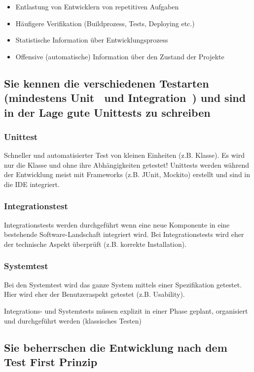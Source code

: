 \begin{itemize}
	\item Entlastung von Entwicklern von repetitiven Aufgaben
	\item Häufigere Verifikation (Buildprozess, Tests, Deploying etc.)
	\item Statistische Information über Entwicklungsprozess
	\item Offensive (automatische) Information über den Zustand der Projekte
\end{itemize}

\subsection{Sie kennen die verschiedenen Testarten (mindestens Unit~ und Integration~) und sind in der Lage gute Unittests zu schreiben}

\subsubsection{Unittest}

Schneller und automatisierter Test von kleinen Einheiten (z.B. Klasse). Es wird nur die Klasse und ohne ihre Abhängigkeiten getestet! Unittests werden während der Entwicklung meist mit Frameworks (z.B. JUnit, Mockito) erstellt und sind in die IDE integriert.

\subsubsection{Integrationstest}

Integrationstests werden durchgeführt wenn eine neue Komponente in eine bestehende Software-Landschaft integriert wird. Bei Integrationstests wird eher der technische Aspekt überprüft (z.B. korrekte Installation).

\subsubsection{Systemtest}

Bei den Systemtest wird das ganze System mittels einer Spezifikation getestet. Hier wird eher der Benutzeraspekt getestet (z.B. Usability).

Integrations- und Systemtests müssen explizit in einer Phase geplant, organisiert und durchgeführt werden (klassisches Testen)


\subsection{Sie beherrschen die Entwicklung nach dem Test First Prinzip}

